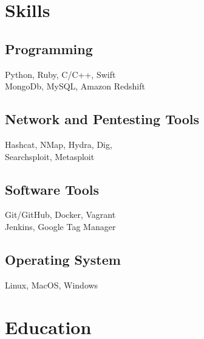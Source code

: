 \documentclass[letterpaper]{deedy-resume} %
\begin{document}
\begin{minipage}[t]{0.33\textwidth} %


\section{Skills}

\subsection{Programming}
Python, Ruby, C/C++, Swift \\
MongoDb, MySQL, Amazon Redshift \\

\sectionspace %

\subsection{Network and Pentesting Tools}
Hashcat, NMap, Hydra, Dig, \\
Searchsploit, Metasploit \\

\sectionspace %

\subsection{Software Tools}
Git/GitHub, Docker, Vagrant \\
Jenkins, Google Tag Manager \\

\sectionspace %

\subsection{Operating System}
Linux, MacOS, Windows \\

\sectionspace %


\section{Education} 


\end{minipage}
\end{document}
